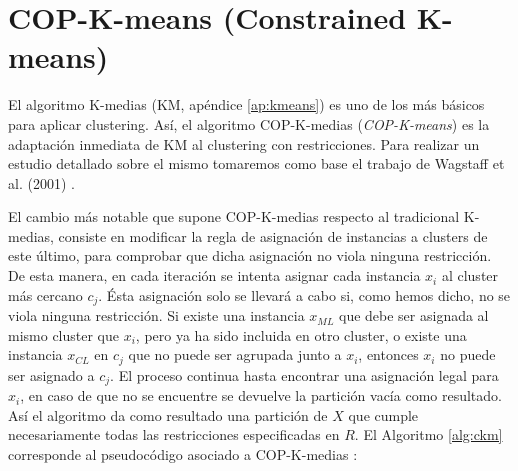 \section{COP-K-means (Constrained K-means)} \label{copkm}

El algoritmo K-medias (\acs{KM}, apéndice \ref{ap:kmeans}) es uno de los más básicos para aplicar clustering. Así, el algoritmo COP-K-medias (\textit{COP-K-means}) es la adaptación inmediata de \acs{KM} al clustering con restricciones. Para realizar un estudio detallado sobre el mismo tomaremos como base el trabajo de Wagstaff et al. (2001) \cite{Wagstaff:2001b}.

El cambio más notable que supone COP-K-medias respecto al tradicional K-medias, consiste en modificar la regla de asignación de instancias a clusters de este último, para comprobar que dicha asignación no viola ninguna restricción. De esta manera, en cada iteración se intenta asignar cada instancia $x_i$ al cluster más cercano $c_j$. Ésta asignación solo se llevará a cabo si, como hemos dicho, no se viola ninguna restricción. Si existe una instancia $x_{ML}$ que debe ser asignada al mismo cluster que $x_i$, pero ya ha sido incluida en otro cluster, o existe una instancia $x_{CL}$ en $c_j$ que no puede ser agrupada junto a $x_i$, entonces $x_i$ no puede ser asignado a $c_j$. El proceso continua hasta encontrar una asignación legal para $x_i$, en caso de que no se encuentre se devuelve la partición vacía como resultado. Así el algoritmo da como resultado una partición de $X$ que cumple necesariamente todas las restricciones especificadas en $R$. El Algoritmo \ref{alg:ckm} corresponde al pseudocódigo asociado a COP-K-medias \cite{Wagstaff:2001b}:


